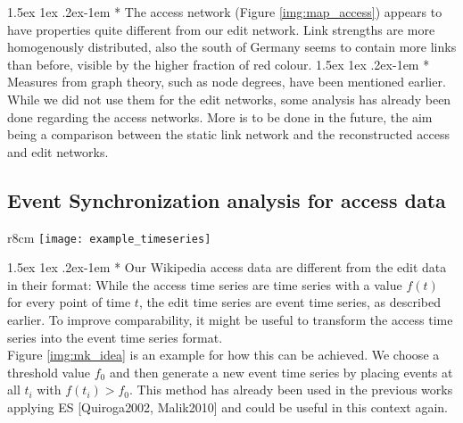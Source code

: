 \documentclass[a4paper,12pt,twoside]{article}
\makeatletter
\renewcommand{\paragraph}{%
  \@startsection{paragraph}{4}%
  {\z@}{1.5ex \@plus 1ex \@minus .2ex}{-1em}%
  {\normalfont\normalsize\bfseries}%
}
\makeatother
\begin{document}
\paragraph*{} The access network (Figure \ref{img:map_access}) appears to have properties quite different from our edit network. Link strengths are more homogenously distributed, also the south of Germany seems to contain more links than before, visible by the higher fraction of red colour.
\paragraph*{} Measures from graph theory, such as node degrees, have been mentioned earlier. While we did not use them for the edit networks, some analysis has already been done regarding the access networks. More is to be done in the future, the aim being a comparison between the static link network and the reconstructed access and edit networks.
\subsection{Event Synchronization analysis for access data}
\begin{wrapfigure}{r}{8cm}
\centering
\texttt{[image: example\_timeseries]}
\caption{A continuous (or discrete) time series can be transformed into an event time series by marking maxima exceeding a certain threshold as events.}
\label{img:mk_idea}
\end{wrapfigure}
\paragraph*{} Our Wikipedia access data are different from the edit data in their format: While the access time series are time series with a value $f(t)$ for every point of time $t$, the edit time series are event time series, as described earlier. To improve comparability, it might be useful to transform the access time series into the event time series format.\\
Figure \ref{img:mk_idea} is an example for how this can be achieved. We choose a threshold value $f_0$ and then generate a new event time series by placing events at all $t_i$ with $f(t_i)>f_0$. This method has already been used in the previous works applying ES [{\sc Quiroga}2002, {\sc Malik}2010] and could be useful in this context again.
\end{document}
